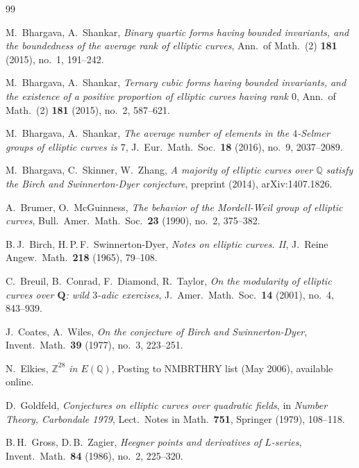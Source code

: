 \documentclass[12pt,a4paper]{amsart}
\theoremstyle{definition}
\theoremstyle{remark}
\begin{document}
\begin{thebibliography}{99}

M.\ Bhargava, A.\ Shankar,
\textit{Binary quartic forms having bounded invariants, and the boundedness
of the average rank of elliptic curves},
Ann.\ of Math.\ (2) \textbf{181} (2015), no.\ 1, 191--242.

M.\ Bhargava, A.\ Shankar,
\textit{Ternary cubic forms having bounded invariants, and the existence of a
positive proportion of elliptic curves having rank $0$},
Ann.\ of Math.\ (2) \textbf{181} (2015), no.\ 2, 587--621.

M.\ Bhargava, A.\ Shankar,
\textit{The average number of elements in the $4$-Selmer groups of elliptic curves is $7$},
J.\ Eur.\ Math.\ Soc.\ \textbf{18} (2016), no.\ 9, 2037--2089.

M.\ Bhargava, C.\ Skinner, W.\ Zhang,
\textit{A majority of elliptic curves over $\mathbb{Q}$ satisfy the Birch and
Swinnerton-Dyer conjecture},
preprint (2014), arXiv:1407.1826.

A.\ Brumer, O.\ McGuinness,
\textit{The behavior of the Mordell-Weil group of elliptic curves},
Bull.\ Amer.\ Math.\ Soc.\ \textbf{23} (1990), no.\ 2, 375--382.

B.\,J.\ Birch, H.\,P.\,F.\ Swinnerton-Dyer,
\textit{Notes on elliptic curves. II},
J.\ Reine Angew.\ Math.\ \textbf{218} (1965), 79--108.

C.\ Breuil, B.\ Conrad, F.\ Diamond, R.\ Taylor,
\textit{On the modularity of elliptic curves over $\mathbf{Q}$: wild $3$-adic exercises},
J.\ Amer.\ Math.\ Soc.\ \textbf{14} (2001), no.\ 4, 843--939.

J.\ Coates, A.\ Wiles,
\textit{On the conjecture of Birch and Swinnerton-Dyer},
Invent.\ Math.\ \textbf{39} (1977), no.\ 3, 223--251.

N.\ Elkies,
\textit{$\mathbb{Z}^{28}$ in $E(\mathbb{Q})$},
Posting to NMBRTHRY list (May 2006), available online.

D.\ Goldfeld,
\textit{Conjectures on elliptic curves over quadratic fields},
in \textit{Number Theory, Carbondale 1979}, Lect.\ Notes in Math.\ \textbf{751},
Springer (1979), 108--118.

B.\,H.\ Gross, D.\,B.\ Zagier,
\textit{Heegner points and derivatives of $L$-series},
Invent.\ Math.\ \textbf{84} (1986), no.\ 2, 225--320.


\end{thebibliography}
\end{document}
